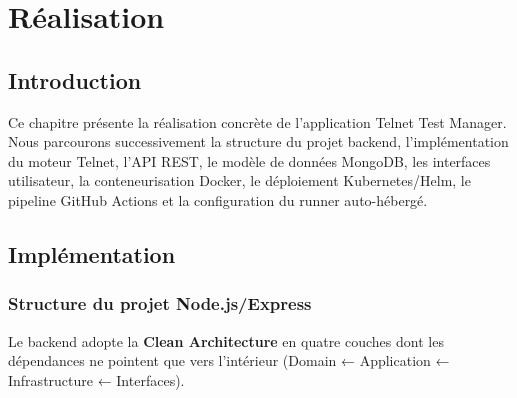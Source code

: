 \chapter{Réalisation}

\section{Introduction}

Ce chapitre présente la réalisation concrète de l'application Telnet Test
Manager. Nous parcourons successivement la structure du projet backend,
l'implémentation du moteur Telnet, l'API REST, le modèle de données
MongoDB, les interfaces utilisateur, la conteneurisation Docker, le
déploiement Kubernetes/Helm, le pipeline GitHub Actions et la configuration
du runner auto-hébergé.

\section{Implémentation}

\subsection{Structure du projet Node.js/Express}

Le backend adopte la \textbf{Clean Architecture} en quatre couches dont
les dépendances ne pointent que vers l'intérieur (Domain ← Application
← Infrastructure ← Interfaces).

